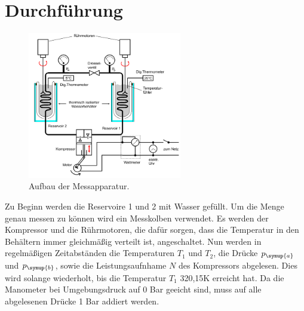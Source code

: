\section{Durchführung}
\label{sec:Durchführung}
\begin{figure}
  \centering
  \includegraphics[width=0.60\textwidth]{messapparatur.png}
  \caption{Aufbau der Messapparatur.}
  \label{fig:aufbau}
\end{figure}
Zu Beginn werden die Reservoire 1 und 2 mit Wasser gefüllt. Um die Menge genau
messen zu können wird ein Messkolben verwendet.
Es werden der Kompressor und die Rührmotoren, die dafür sorgen, dass die Temperatur in
den Behältern immer gleichmäßig verteilt ist, angeschaltet.
Nun werden in regelmäßigen Zeitabständen die Temperaturen $T_1$ und $T_2$, die Drücke
$p_\symup{a}$ und $p_\symup{b}$, sowie die Leistungsaufnhame $N$ des Kompressors
abgelesen. Dies wird solange wiederholt, bis die Temperatur $T_1$ 320,15\si{\kelvin}
erreicht hat. Da die Manometer bei Umgebungsdruck auf 0 Bar geeicht sind,
muss auf alle abgelesenen Drücke 1 Bar addiert werden.
